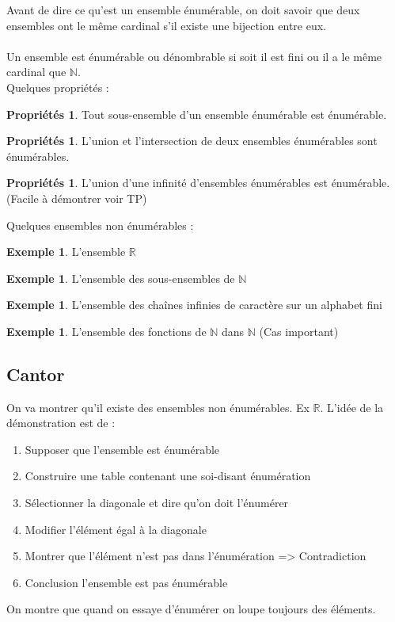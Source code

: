 \documentclass[11pt,a4paper]{article}
\newcommand{\R}{\mathbb{R}}
\newcommand{\N}{\mathbb{N}}
\theoremstyle{definition}
\newtheorem{myprop}[mydef]{Propriétés}
\newtheorem{myexem}[mydef]{Exemple}
\begin{document}
Avant de dire ce qu'est un ensemble énumérable, on doit savoir que deux ensembles
ont le même cardinal s’il existe une bijection entre eux.

\paragraph{}
Un ensemble est énumérable ou dénombrable si soit il est fini ou il a le même cardinal que $\mathbb{\N}$. \\
Quelques propriétés : 
\begin{myprop}
	Tout sous-ensemble d'un ensemble énumérable est énumérable.
\end{myprop}

\begin{myprop}
L'union et l'intersection de deux ensembles énumérables sont énumérables.
\end{myprop}

\begin{myprop}
L'union d'une infinité d'ensembles énumérables est énumérable. (Facile à
		démontrer voir TP)
\end{myprop}

Quelques ensembles non énumérables : 
\begin{myexem}
 L'ensemble $\R$
\end{myexem}

\begin{myexem}
 L'ensemble des sous-ensembles de $\N$
\end{myexem}

\begin{myexem}
 L'ensemble des chaînes infinies de caractère sur un alphabet fini
\end{myexem}

\begin{myexem}
 L'ensemble des fonctions de $\N$ dans $\N$ (Cas important)
\end{myexem}


\subsection{Cantor}
\label{sub:cantor}
On va montrer qu'il existe des ensembles non énumérables. Ex $\R$.
L'idée de la démonstration est de :
\begin{enumerate}
	\item Supposer que l'ensemble est énumérable
 	\item Construire une table contenant une soi-disant énumération
	\item Sélectionner la diagonale et dire qu'on doit l'énumérer
	\item Modifier l'élément égal à la diagonale
	\item Montrer que l'élément n'est pas dans l'énumération => Contradiction
	\item Conclusion l'ensemble est pas énumérable
\end{enumerate}
On montre que quand on essaye d'énumérer on loupe toujours des éléments.
\end{document}
